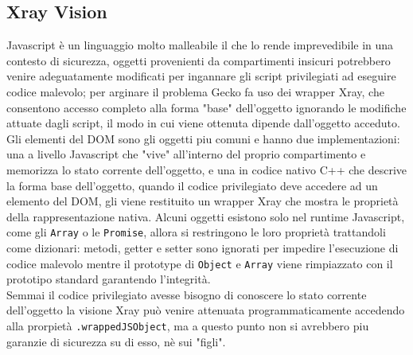\documentclass{sapthesis}
\newcommand{\code}[1]{\texttt{#1}}
\begin{document}
        \subsection{Xray Vision}
        \label{sec:sicurezza-xray-vision}
            Javascript è un linguaggio molto malleabile il che lo rende imprevedibile in una contesto di
            sicurezza, oggetti provenienti da compartimenti insicuri potrebbero venire adeguatamente
            modificati per ingannare gli script privilegiati ad eseguire codice malevolo; per arginare
            il problema Gecko fa uso dei wrapper Xray, che consentono accesso completo alla forma "base"
            dell'oggetto ignorando le modifiche attuate dagli script, il modo in cui viene ottenuta
            dipende dall'oggetto acceduto.\\
            Gli elementi del DOM sono gli oggetti piu comuni e hanno due implementazioni: 
            una a livello Javascript che "vive" all'interno del proprio compartimento e memorizza lo
            stato corrente dell'oggetto, e una in codice nativo C++ che descrive la forma base
            dell'oggetto, quando il codice privilegiato deve accedere ad un elemento del DOM, gli viene
            restituito un wrapper Xray che mostra le proprietà della rappresentazione nativa. 
            Alcuni oggetti esistono solo nel runtime Javascript, come gli \code{Array} o le \code{Promise},
            allora si restringono le loro proprietà trattandoli come dizionari: metodi, getter e setter 
            sono ignorati per impedire l'esecuzione di codice malevolo mentre il prototype di \code{Object}
            e \code{Array} viene rimpiazzato con il prototipo standard garantendo l'integrità.\\
            Semmai il codice privilegiato avesse bisogno di conoscere lo stato corrente dell'oggetto la
            visione Xray può venire attenuata programmaticamente accedendo alla prorpietà \code{.wrappedJSObject},
            ma a questo punto non si avrebbero piu garanzie di sicurezza su di esso, nè sui "figli".
\end{document}
